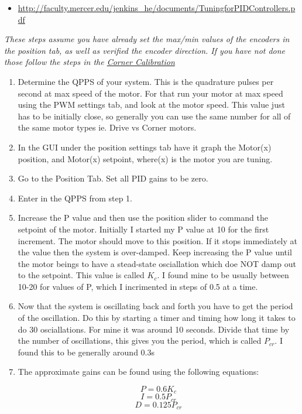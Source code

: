 \documentclass[12pt]{article}
\begin{document}
\begin{itemize}
	\item  \href{http://faculty.mercer.edu/jenkins\_he/documents/TuningforPIDControllers.pdf}{http://faculty.mercer.edu/jenkins\_he/documents/TuningforPIDControllers.pdf}
\end{itemize}

\noindent \textit{These steps assume you have already set the max/min values of the encoders in the position tab, as well as verified the encoder direction. If you have not done those follow the steps in the \hyperref[corner_cal]{Corner Calibration}}
\begin{enumerate}

	\item Determine the QPPS of your system. This is the quadrature pulses per second at max speed of the motor. For that run your motor at max speed using the PWM settings tab, and look at the motor speed. This value just has to be initially close, so generally you can use the same number for all of the same motor types ie. Drive vs Corner motors.
	\item In the GUI under the position settings tab have it graph the Motor(x) position, and Motor(x) setpoint, where(x) is the motor you are tuning.
	\item Go to the Position Tab. Set all PID gains to be zero. 
	\item Enter in the QPPS from step 1.
	\item Increase the P value and then use the position slider to command the setpoint of the motor. Initially I started my P value at 10 for the first increment. The motor should move to this position. If it stops immediately at the value then the system is over-damped. Keep increasing the P value until the motor beings to have a stead-state osciallation which doe NOT damp out to the setpoint. This value is called $K_{c}$. I found mine to be usually between 10-20 for values of P, which I incrimented in steps of 0.5 at a time.
	\item Now that the system is oscillating back and forth you have to get the period of the oscillation. Do this by starting a timer and timing how long it takes to do 30 osciallations. For mine it was around 10 seconds. Divide that time by the number of oscillations, this gives you the period, which is called $P_{cr}$. I found this to be generally around 0.3s
	\item The approximate gains can be found using the following equations:

\begin{equation}
	P =  0.6 K_c 
\end{equation}
\begin{equation}
	I = 0.5 P_{cr}
\end{equation}
\begin{equation}
	D = 0.125 P_{cr}
\end{equation}


\end{enumerate}
\end{document}
